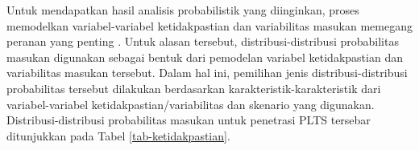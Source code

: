 Untuk mendapatkan hasil analisis probabilistik yang diinginkan, proses memodelkan variabel-variabel ketidakpastian dan variabilitas masukan memegang peranan yang penting \cite{Hasan2019}. Untuk alasan tersebut, distribusi-distribusi probabilitas masukan digunakan sebagai bentuk dari pemodelan variabel ketidakpastian dan variabilitas masukan tersebut. Dalam hal ini, pemilihan jenis distribusi-distribusi probabilitas tersebut dilakukan berdasarkan karakteristik-karakteristik dari variabel-variabel ketidakpastian/variabilitas dan skenario yang digunakan. Distribusi-distribusi probabilitas masukan untuk penetrasi PLTS tersebar ditunjukkan pada Tabel \ref{tab-ketidakpastian}.
